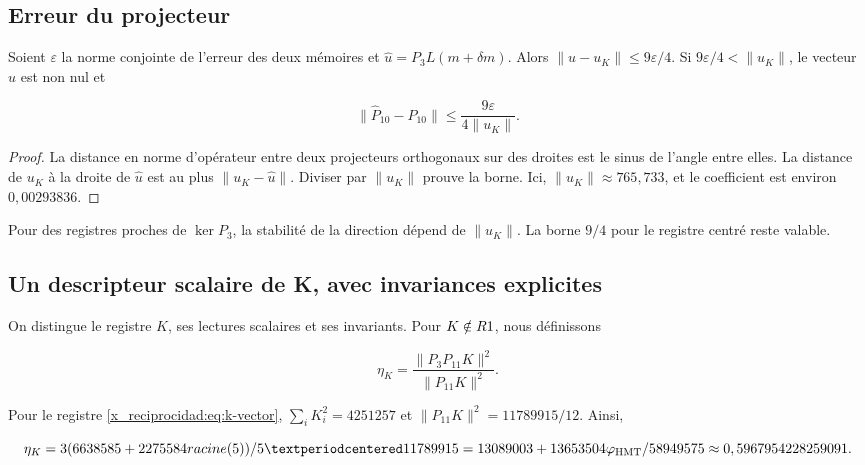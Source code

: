 \subsection{Erreur du projecteur}

Soient \(\varepsilon\) la norme conjointe de l’erreur des deux
mémoires et \(\widehat u=P_3L(m+\delta m)\).
Alors \(\|\widehat u-u_K\|\le9\varepsilon/4\).
Si \(9\varepsilon/4<\|u_K\|\), le vecteur \(\widehat u\) est non
nul et



\begin{equation}
\boxed{
\|\widehat P_{10}-P_{10}\|
\le\frac{9\varepsilon}{4\|u_K\|}.
}
\label{x_reciprocidad:nuc11:eq:15}
\end{equation}



\begin{proof}
La distance en norme d’opérateur entre deux projecteurs orthogonaux
sur des droites est le sinus de l’angle entre elles.
La distance de \(u_K\) à la droite de \(\widehat u\) est au plus
\(\|u_K-\widehat u\|\). Diviser par \(\|u_K\|\) prouve la borne.
Ici, \(\|u_K\|\approx765{,}733\), et le coefficient est
environ \(0{,}00293836\).
\end{proof}
Pour des registres proches de \(\ker P_3\), la stabilité de la
direction dépend de \(\|u_K\|\).
La borne \(9/4\) pour le registre centré reste valable.

\subsection{Un descripteur scalaire de K, avec invariances explicites}

On distingue le registre \(K\), ses lectures scalaires et ses
invariants. Pour \(K\notin R1\), nous définissons



\begin{equation}
\eta_K=\frac{\|P_3P_{11}K\|^2}{\|P_{11}K\|^2}.
\label{x_reciprocidad:nuc11:eq:16}
\end{equation}



Pour le registre \eqref{x_reciprocidad:eq:k-vector},
\(\sum_iK_i^2=4251257\) et
\(\|P_{11}K\|^2=11789915/12\). Ainsi,



\begin{equation}
\eta_K=
\frac{3(6638585+2275584\sqrt5)}{5\cdot11789915}
=\frac{13089003+13653504\varphi_{\rm HMT}}{58949575}
\approx0,5967954228259091.
\label{x_reciprocidad:nuc11:eq:17}
\end{equation}



